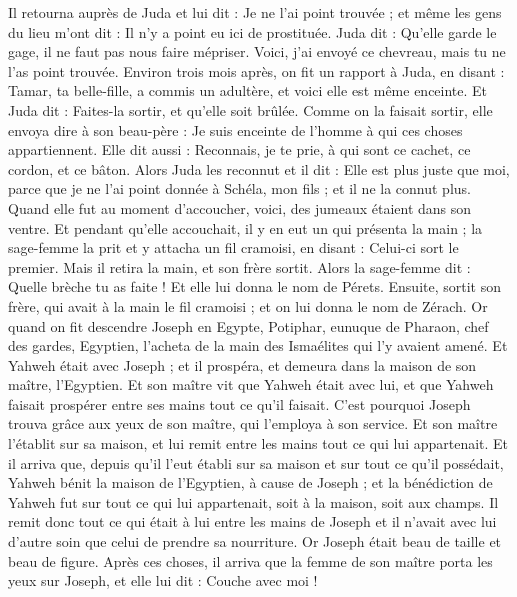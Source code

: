 \begin{multicols}{2}
Il retourna auprès de Juda et lui dit : Je ne l'ai point trouvée ; et même les gens du lieu m'ont dit : Il n'y a point eu ici de prostituée.
Juda dit : Qu'elle garde le gage, il ne faut pas nous faire mépriser. Voici, j'ai envoyé ce chevreau, mais tu ne l'as point trouvée.
Environ trois mois après, on fit un rapport à Juda, en disant : Tamar, ta belle-fille, a commis un adultère, et voici elle est même enceinte. Et Juda dit : Faites-la sortir, et qu'elle soit brûlée.
Comme on la faisait sortir, elle envoya dire à son beau-père : Je suis enceinte de l'homme à qui ces choses appartiennent. Elle dit aussi : Reconnais, je te prie, à qui sont ce cachet, ce cordon, et ce bâton.
Alors Juda les reconnut et il dit : Elle est plus juste que moi, parce que je ne l'ai point donnée à Schéla, mon fils ; et il ne la connut plus.
Quand elle fut au moment d'accoucher, voici, des jumeaux étaient dans son ventre.
Et pendant qu'elle accouchait, il y en eut un qui présenta la main ; la sage-femme la prit et y attacha un fil cramoisi, en disant : Celui-ci sort le premier.
Mais il retira la main, et son frère sortit. Alors la sage-femme dit : Quelle brèche tu as faite ! Et elle lui donna le nom de Pérets.
Ensuite, sortit son frère, qui avait à la main le fil cramoisi ; et on lui donna le nom de Zérach.
\VerseOne{}Or quand on fit descendre Joseph en Egypte, Potiphar, eunuque de Pharaon, chef des gardes, Egyptien, l'acheta de la main des Ismaélites qui l'y avaient amené.
Et Yahweh était avec Joseph ; et il prospéra, et demeura dans la maison de son maître, l'Egyptien.
Et son maître vit que Yahweh était avec lui, et que Yahweh faisait prospérer entre ses mains tout ce qu'il faisait.
C'est pourquoi Joseph trouva grâce aux yeux de son maître, qui l'employa à son service. Et son maître l'établit sur sa maison, et lui remit entre les mains tout ce qui lui appartenait.
Et il arriva que, depuis qu'il l'eut établi sur sa maison et sur tout ce qu'il possédait, Yahweh bénit la maison de l'Egyptien, à cause de Joseph ; et la bénédiction de Yahweh fut sur tout ce qui lui appartenait, soit à la maison, soit aux champs.
Il remit donc tout ce qui était à lui entre les mains de Joseph et il n'avait avec lui d'autre soin que celui de prendre sa nourriture. Or Joseph était beau de taille et beau de figure.
Après ces choses, il arriva que la femme de son maître porta les yeux sur Joseph, et elle lui dit : Couche avec moi !

\end{multicols}
